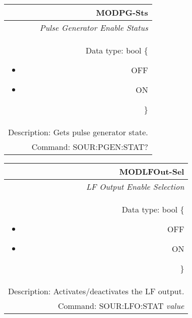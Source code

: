 \documentclass[openany]{article}
\begin{document}
		\begin{tabular}{N}
			\hline
			\bfseries MODPG-Sts \\ \hline
			\emph{Pulse Generator Enable Status} \\
			Data type: bool \{\begin{itemize}[noitemsep]
				\small
				\item[] OFF
				\item[] ON
			\end{itemize}\} \\
			Description: Gets pulse generator state. \\
			Command: SOUR:PGEN:STAT? \\
			
		\end{tabular}
%
		\begin{tabular}{N}
			\hline
			\bfseries MODLFOut-Sel \\ \hline
			\emph{LF Output Enable Selection} \\
			Data type: bool \{\begin{itemize}[noitemsep]
				\small
				\item[] OFF
				\item[] ON
			\end{itemize}\} \\
			Description: Activates/deactivates the LF output. \\
			Command: SOUR:LFO:STAT \emph{value} \\

		\end{tabular}
\end{document}
